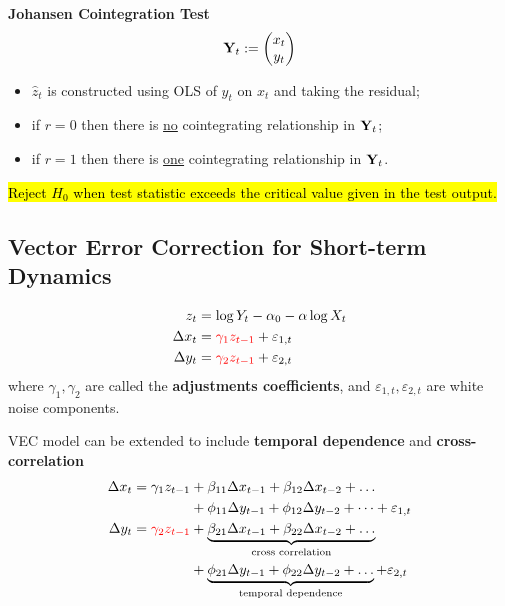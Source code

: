 \documentclass[11pt]{article}
\begin{document}
		    \begin{remark}
		        \textbf{Johansen Cointegration Test}
		        \begin{equation}
		            \textbf{Y}_t := \begin{pmatrix}x_t \\ y_t \end{pmatrix}
		        \end{equation}
		        \begin{itemize}
		        	\item $\hat{z}_t$ is constructed using OLS of $y_t$ on $x_t$ and taking the residual;
		            \item if $r=0$ then there is \ul{no} cointegrating relationship in $\textbf{Y}_t$;
		            \item if $r=1$ then there is \ul{one} cointegrating relationship in $\textbf{Y}_t$.
		        \end{itemize}
		        \hl{Reject $H_0$ when test statistic exceeds the critical value given in the test output.}
		    \end{remark}

        \subsection{Vector Error Correction for Short-term Dynamics}
            \begin{definition}
                \begin{align}
                    z_t &= \log Y_t - \alpha_0 - \alpha \log X_t \\
                    \Delta x_t &= \textcolor{red}{\gamma_1 z_{t-1}} + \varepsilon_{1,t} \\
                    \Delta y_t &= \textcolor{red}{\gamma_2 z_{t-1}} + \varepsilon_{2,t}
                \end{align}
                where $\gamma_1, \gamma_2$ are called the \textbf{adjustments coefficients}, and $\varepsilon_{1, t}, \varepsilon_{2, t}$ are white noise components.
            \end{definition}

            \begin{definition}
                VEC model can be extended to include \textbf{temporal dependence} and \textbf{cross-correlation}
                \begin{align}
                    \Delta x_t = \gamma_1 z_{t-1} 
                    &+ \beta_{11} \Delta x_{t-1} + \beta_{12} \Delta x_{t-2} + \dots \\
                    &+ \phi_{11} \Delta y_{t-1} + \phi_{12} \Delta y_{t-2} + \dots + \varepsilon_{1, t} \\
                    \Delta y_t = \textcolor{red}{\gamma_2 z_{t-1}} 
                    &+ \underbrace{\beta_{21} \Delta x_{t-1} + \beta_{22} \Delta x_{t-2} + \dots}_{\text{{cross correlation}}} \\
                    &+ \underbrace{\phi_{21} \Delta y_{t-1} + \phi_{22} \Delta y_{t-2} + \dots}_{\text{{temporal dependence}}} + \varepsilon_{2, t}
                \end{align}
            \end{definition}
            
\end{document}
